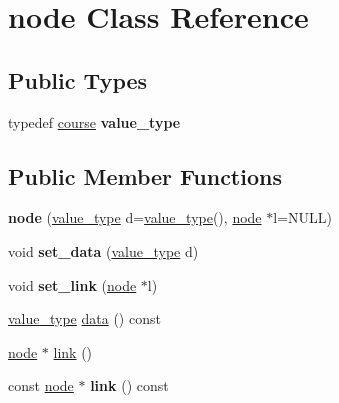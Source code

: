 \hypertarget{classnode}{\section{node Class Reference}
\label{classnode}
}
\subsection*{Public Types}
\begin{DoxyCompactItemize}
\item 
\hypertarget{classnode_af79958a8234d1a3d642adf6637cb9f9b}{typedef \hyperlink{classcourse}{course} {\bfseries value\-\_\-type}}\label{classnode_af79958a8234d1a3d642adf6637cb9f9b}

\end{DoxyCompactItemize}
\subsection*{Public Member Functions}
\begin{DoxyCompactItemize}
\item 
\hypertarget{classnode_a4d89d50fbee6842a2588ef0c07063cb8}{{\bfseries node} (\hyperlink{classcourse}{value\-\_\-type} d=\hyperlink{classcourse}{value\-\_\-type}(), \hyperlink{classnode}{node} $\ast$l=N\-U\-L\-L)}\label{classnode_a4d89d50fbee6842a2588ef0c07063cb8}

\item 
\hypertarget{classnode_ac9906af97ebcd35ffa46145f865eed6c}{void {\bfseries set\-\_\-data} (\hyperlink{classcourse}{value\-\_\-type} d)}\label{classnode_ac9906af97ebcd35ffa46145f865eed6c}

\item 
\hypertarget{classnode_ae9887204ac73c954e3a4da3fa15c9df9}{void {\bfseries set\-\_\-link} (\hyperlink{classnode}{node} $\ast$l)}\label{classnode_ae9887204ac73c954e3a4da3fa15c9df9}

\item 
\hyperlink{classcourse}{value\-\_\-type} \hyperlink{classnode_a9c9e0f956de2f1b27d2b3d89f1021472}{data} () const 
\item 
\hyperlink{classnode}{node} $\ast$ \hyperlink{classnode_a3871737751cf0fd295a07c77d0c72f82}{link} ()
\item 
\hypertarget{classnode_a9fcc39fcb8cab3d2c75d24955054f806}{const \hyperlink{classnode}{node} $\ast$ {\bfseries link} () const }\label{classnode_a9fcc39fcb8cab3d2c75d24955054f806}

\end{DoxyCompactItemize}


